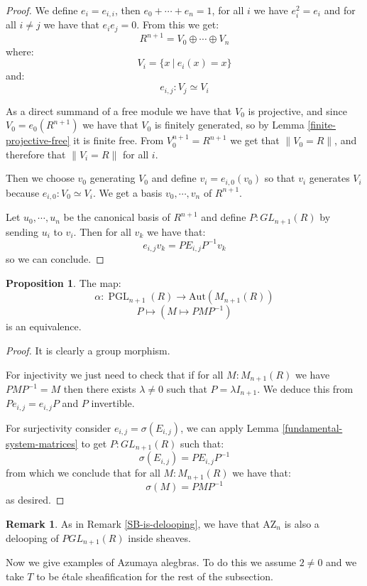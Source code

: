 \documentclass[10pt,a4paper]{article}
\theoremstyle{definition}
\newtheorem{remark}[theorem]{Remark}
\newtheorem{proposition}[theorem]{Proposition}
\DeclareMathOperator{\PGL}{PGL}
\newcommand{\AZ}{\mathrm{AZ}}
\newcommand{\propTrunc}[1]{\lVert #1 \rVert}
\newcommand{\Aut}{\mathrm{Aut}}
\begin{document}
\begin{proof}
We define $e_i = e_{i,i}$, then $e_0+\cdots+e_n = 1$, for all $i$ we have $e_i^2=e_i$ and for all $i\not=j$ we have that $e_ie_j=0$. From this we get:
\[R^{n+1} = V_0\oplus\cdots\oplus V_n\]
where:
\[V_i = \{x\ |\ e_i(x)=x\}\]
and:
\[e_{i,j}:V_j\simeq V_i\]

As a direct summand of a free module we have that $V_0$ is projective, and since $V_0 = e_{0}(R^{n+1})$ we have that $V_0$ is finitely generated, so by Lemma \ref{finite-projective-free} it is finite free. From $V_0^{n+1}=R^{n+1}$ we get that $\propTrunc{V_0=R}$, and therefore that $\propTrunc{V_i=R}$ for all $i$.

Then we choose $v_0$ generating $V_0$ and define $v_i = e_{i,0}(v_0)$ so that $v_i$ generates $V_i$ because $e_{i,0}:V_0\simeq V_i$. We get a basis $v_0,\cdots,v_n$ of $R^{n+1}$.

Let $u_0,\cdots,u_n$ be the canonical basis of $R^{n+1}$ and define $P:GL_{n+1}(R)$ by sending $u_i$ to $v_i$. Then for all $v_k$ we have that:
\[e_{i,j}v_k = PE_{i,j}P^{-1}v_k\]
so we can conclude.
\end{proof}

\begin{proposition}\label{Aut-MnR-PGL}
The map:
\[\alpha:\PGL_{n+1}(R)\to\Aut(M_{n+1}(R))\]
\[P\mapsto (M\mapsto PMP^{-1})\]
is an equivalence.
\end{proposition}

\begin{proof}
It is clearly a group morphism. 

For injectivity we just need to check that if for all $M:M_{n+1}(R)$ we have $PMP^{-1}=M$ then there exists $\lambda\not=0$ such that $P=\lambda I_{n+1}$. We deduce this from $Pe_{i,j} = e_{i,j}P$ and $P$ invertible.

For surjectivity consider $e_{i,j}=\sigma(E_{i,j})$, we can apply Lemma \ref{fundamental-system-matrices} to get $P:GL_{n+1}(R)$ such that:
\[\sigma(E_{i,j}) = PE_{i,j}P^{-1}\]
from which we conclude that for all $M:M_{n+1}(R)$ we have that:
\[\sigma(M) = PMP^{-1}\]
as desired.
\end{proof}

\begin{remark}\label{AZ-is-delooping}
As in Remark \ref{SB-is-delooping}, we have that $\AZ_n$ is also a delooping of $PGL_{n+1}(R)$ inside sheaves.
\end{remark}

Now we give examples of Azumaya alegbras. To do this we assume $2\not=0$ and we take $T$ to be étale sheafification for the rest of the subsection.
\end{document}
